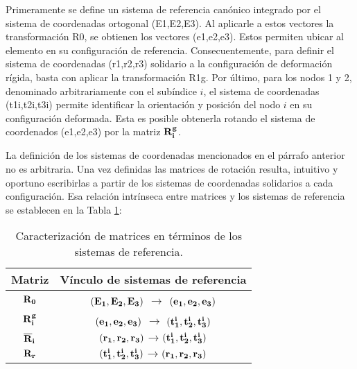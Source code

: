 Primeramente se define un sistema de referencia canónico integrado por el sistema de coordenadas ortogonal (\gls{E1},\gls{E2},\gls{E3}). Al aplicarle a estos vectores la transformación \gls{R0}, se obtienen los vectores (\gls{e1},\gls{e2},\gls{e3}). Estos permiten ubicar al elemento en su configuración de referencia. Consecuentemente, para definir el sistema de coordenadas (\gls{r1},\gls{r2},\gls{r3}) solidario a la configuración de deformación rígida, basta con aplicar la transformación \gls{R1g}. Por último, para los nodos 1 y 2, denominado arbitrariamente con el subíndice $i$, el sistema de coordenadas (\gls{t1i},\gls{t2i},\gls{t3i}) permite identificar la orientación y posición del nodo $i$ en su configuración deformada. Esta es posible obtenerla rotando el sistema de coordenados (\gls{e1},\gls{e2},\gls{e3}) por la matriz $\bf{R}_i^g$. 



La definición de los sistemas de coordenadas mencionados en el párrafo anterior no es arbitraria. Una vez definidas las matrices de rotación resulta, intuitivo y oportuno escribirlas a partir de los sistemas de coordenadas solidarios a cada configuración. Esa relación intrínseca entre matrices y los sistemas de referencia se establecen en la Tabla \ref{Table:PRE:RelacionVM}:

\begin{table}[htbp]
	\begin{center}
		\begin{tabular}{|c|c|}
			\hline
			Matriz & Vínculo de sistemas de referencia \\
			\hline \hline
			$\bf{R}_0$ &$(\bf{E_1},\bf{E_2},\bf{E_3})$ $\rightarrow$
			$(\bf{e_1},\bf{e_2},\bf{e_3})$   \\ \hline
			$\bf{R}_i^g$ & $(\bf{e_1},\bf{e_2},\bf{e_3})$ $\rightarrow$
			$(\bf{t_1^i},\bf{t_2^i},\bf{t_3^i})$ \\ \hline
			$\bf{\overline{R}}_i$ &
			$(\bf{r_1},\bf{r_2},\bf{r_3})$$\rightarrow$$(\bf{t_1^i},\bf{t_2^i},\bf{t_3^i})$
			\\ \hline
			$\bf{R}_r$ &
		$(\bf{t_1^i},\bf{t_2^i},\bf{t_3^i})$$\rightarrow$$(\bf{r_1},\bf{r_2},\bf{r_3})$ \\
			\hline
		\end{tabular}
		\caption{Caracterización de matrices en términos de los sistemas de referencia.}
		\label{Table:PRE:RelacionVM}
	\end{center}
\end{table}


